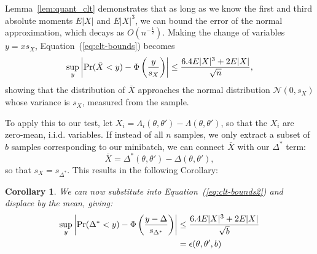 \documentclass[twoside]{article} \usepackage{aistats2017}
\newtheorem{corollary}{Corollary}
\begin{document}


Lemma~\ref{lem:quant_clt} demonstrates that as long as we know the first and
third absolute moments $E|X|$ and $E|X|^3$, we can bound the error of the normal
approximation, which decays as $O(n^{-\frac{1}{2}})$. Making the change of
variables $y = x s_X$, Equation~(\ref{eq:clt-bounds}) becomes
\begin{equation}\label{eq:clt-bounds2}
   \sup_y\left|{\rm Pr}(\bar{X}< y) - \Phi\left(\frac{y}{s_X}\right)\right| \leq \frac{6.4E|X|^3+2E|X|}{\sqrt{n}},
\end{equation}
showing that the distribution of $\bar{X}$ approaches the normal distribution
$\mathcal{N}(0,s_X)$ whose variance is $s_X$,
measured from the sample.

To apply this to our test, let $X_i = \Lambda_i(\theta,\theta') -
\Lambda(\theta,\theta')$, so that the $X_i$ are zero-mean, i.i.d. variables. If
instead of all $n$ samples, we only extract a subset of $b$ samples
corresponding to our minibatch, we can connect $\bar{X}$ with our $\Delta^*$
term:
\begin{equation}\label{eq:x-hat}
    \bar{X} = \Delta^*(\theta,\theta') - \Delta(\theta,\theta'),
\end{equation}
so that $s_X = s_{\Delta^*}$.
This results in the following Corollary:

\begin{corollary}\label{cor:our_bound_delta_prime}
We can now substitute into Equation~(\ref{eq:clt-bounds2}) and displace by the mean, giving:
\begin{equation}\label{eq:clt-bounds3}
\begin{split}
    \sup_y\left|{\rm Pr}(\Delta^*< y) - \Phi\left(\frac{y-\Delta}{s_{\Delta^*}}\right)\right| &\leq \frac{6.4E|X|^3+2E|X|}{\sqrt{b}} \\
    & = \epsilon(\theta,\theta',b) \\
\end{split}
\end{equation}
\end{corollary}
\end{document}
